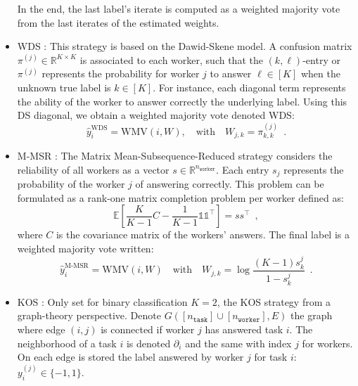 \documentclass{cap2024}
\begin{document}
\begin{itemize}
    In the end, the last label's iterate is computed as a weighted majority vote from the last iterates of the estimated weights.

    \item WDS \citep{dawid_maximum_1979}:
    This strategy is based on the Dawid-Skene model. A confusion matrix $\pi^{(j)}\in\mathbb{R}^{K\times K}$ is associated to each worker, such that the $(k,\ell)$-entry or $\pi^{(j)}$ represents the probability for worker $j$ to answer $\ell\in[K]$ when the unknown true label is $k\in[K]$. For instance, each diagonal term represents the ability of the worker to answer correctly the underlying label.
  Using this DS diagonal, we obtain a weighted majority vote denoted WDS:
  \begin{equation}
    \hat{y}_i^\text{WDS}= \mathrm{WMV}\left(i, W\right),\quad
    \text{with}\quad W_{j,k} = \pi^{(j)}_{k,k}\enspace.
  \end{equation}
  \item M-MSR \citep{ma2020adversarial}: The Matrix Mean-Subsequence-Reduced strategy considers the reliability of all workers as a vector $s\in\mathbb{R}^{n_\texttt{worker}}$. Each entry $s_j$ represents the probability of the worker $j$ of answering correctly.
  This problem can be formulated as a rank-one matrix completion problem per worker defined as:
  \[\mathbb{E}\left[\frac{K}{K-1}C - \frac{1}{K-1}\mathds{1}\mathds{1}^\top\right]=ss^\top \enspace,\]
  where $C$ is the covariance matrix of the workers' answers.
  The final label is a weighted majority vote written:
  \begin{equation}
    \hat y_i^{\text{M-MSR}} = \mathrm{WMV}(i, W)\quad \text{with}\quad W_{j,k}=\log\frac{(K-1)s^j_k}{1-s^j_k}\enspace.
  \end{equation}

  \item KOS \citep{karger2011iterative}: Only set for binary classification $K=2$, the KOS strategy from a graph-theory perspective.
  Denote $G([n_\texttt{task}]\cup [n_\texttt{worker}], E)$ the graph where edge $(i,j)$ is connected if worker $j$ has answered task $i$. The neighborhood of a task $i$ is denoted $\partial_i$ and the same with index $j$ for workers.
  On each edge is stored the label answered by worker $j$ for task $i$: $y_i^{(j)}\in\{-1,1\}$.


\end{itemize}
\end{document}
